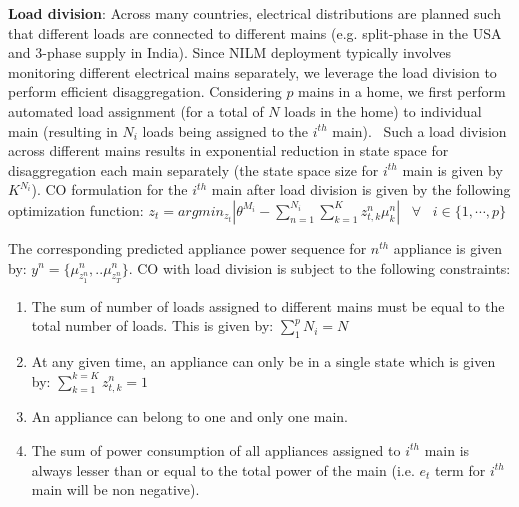 \documentclass[conference]{IEEEtran}
\newcommand{\denselistbib}{
  \itemsep -.6pt\topsep-4pt\partopsep-4pt
}
\begin{document}
\noindent \textbf{Load division}: Across many countries, electrical distributions are planned such that different loads are connected to different mains (e.g. split-phase in the USA and 3-phase supply in India). Since NILM deployment typically involves monitoring different electrical mains separately, we leverage the load division to perform efficient disaggregation. Considering $p$ mains in a home, we first perform automated load assignment (for a total of $N$ loads in the home) to individual main (resulting in $N_i$ loads being assigned to the $i^{th}$ main).%
~Such a load division across different mains results in exponential reduction in state space for disaggregation each main separately (the state space size for $i^{th}$ main is given by $K^{N_i}$). %
CO formulation for the $i^{th}$ main after load division is given by the following optimization function: 
\vspace{-2mm}
$z_t=arg min_{z_t}|\theta^{M_i}-\sum\limits_{n=1}^{N_i}\sum\limits_{k=1}^{K}z_{t,k}^n\mu_k^n| \;\;\; \forall \;\;\; i\in \{1,\cdots,p\}$

\noindent The corresponding predicted appliance power sequence for $n^{th}$ appliance is given by: $y^n=\{\mu_{z_1^n}^n,..\mu_{z_T^n}^n \}$. CO with load division is subject to the following constraints:
\vspace{-2mm}
\begin{enumerate}\denselistbib
\item The sum of number of loads assigned to different mains must be equal to the total number of loads. This is given by: $\sum\limits_{1}^{p}{N_i}=N$
\item At any given time, an appliance can only be in a single state which is given by: $\sum\limits_{k=1}^{k=K} z_{t,k}^n=1$
\item An appliance can belong to one and only one main. 
\item The sum of power consumption of all appliances assigned to $i^{th}$ main is always lesser than or equal to the total power of the main (i.e. $e_t$ term for $i^{th}$ main will be non negative).
\end{enumerate}


\end{document}
